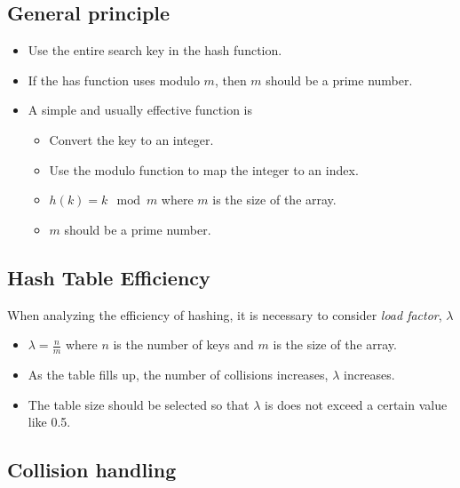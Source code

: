 \documentclass[letterpaper,12pt]{article}
\begin{document}
\subsection{General principle}
\begin{itemize}
    \item Use the entire search key in the hash function.
    \item If the has function uses modulo $m$, then $m$ should be a prime number.
    \item A simple and usually effective function is \begin{itemize}
        \item Convert the key to an integer.
        \item Use the modulo function to map the integer to an index.
        \item $h(k) = k \mod m$ where $m$ is the size of the array.
        \item $m$ should be a prime number.
    \end{itemize}
\end{itemize}
\subsection{Hash Table Efficiency}
When analyzing the efficiency of hashing, it is necessary to consider \textit{load factor}, $\lambda$\begin{itemize}
    \item $\lambda = \frac{n}{m}$ where $n$ is the number of keys and $m$ is the size of the array.
    \item As the table fills up, the number of collisions increases, $\lambda$ increases.
    \item The table size should be selected so that $\lambda$ is does not exceed a certain value like 0.5. 
\end{itemize}

\subsection{Collision handling}
\end{document}
